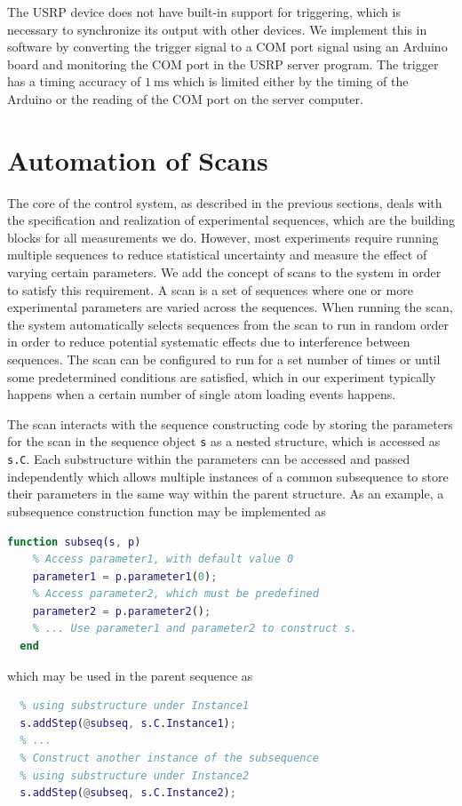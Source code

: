 The USRP device does not have built-in support for triggering,
which is necessary to synchronize its output with other devices.
We implement this in software by converting the trigger signal to a COM port signal
using an Arduino board and monitoring the COM port in the USRP server program.
The trigger has a timing accuracy of $1~\mathrm{ms}$
which is limited either by the timing of the Arduino or
the reading of the COM port on the server computer.

\section{Automation of Scans}
\label{ch:computer-control:scan}

The core of the control system, as described in the previous sections,
deals with the specification and realization of experimental sequences,
which are the building blocks for all measurements we do.
However, most experiments require running multiple sequences
to reduce statistical uncertainty and measure the effect of varying certain parameters.
We add the concept of scans to the system in order to satisfy this requirement.
A scan is a set of sequences where one or more experimental parameters are varied
across the sequences.
When running the scan, the system automatically selects sequences
from the scan to run in random order in order to reduce potential systematic effects
due to interference between sequences.
The scan can be configured to run for a set number of times
or until some predetermined conditions are satisfied,
which in our experiment typically happens
when a certain number of single atom loading events happens.

The scan interacts with the sequence constructing code
by storing the parameters for the scan in the sequence object \verb`s` as a nested structure,
which is accessed as \verb`s.C`.
Each substructure within the parameters can be accessed and passed independently
which allows multiple instances of a common subsequence
to store their parameters in the same way within the parent structure.
As an example, a subsequence construction function may be implemented as
\begin{lstlisting}[language=Matlab]
  function subseq(s, p)
    % Access parameter1, with default value 0
    parameter1 = p.parameter1(0);
    % Access parameter2, which must be predefined
    parameter2 = p.parameter2();
    % ... Use parameter1 and parameter2 to construct s.
  end
\end{lstlisting}
which may be used in the parent sequence as
\begin{lstlisting}[language=Matlab]
  % Construct one instance of the subsequence
  % using substructure under Instance1
  s.addStep(@subseq, s.C.Instance1);
  % ...
  % Construct another instance of the subsequence
  % using substructure under Instance2
  s.addStep(@subseq, s.C.Instance2);
\end{lstlisting}

